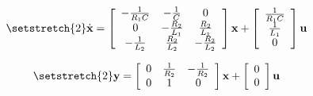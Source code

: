 \[ \setstretch{2}
  \dot{\textbf{x}}=
  \left[
    {\begin{array}{ccc}
      -\frac{1}{R_1 C} & -\frac{1}{C}     & 0 \\
      0                & -\frac{R_2}{L_1} & \frac{R_2}{L_1} \\
      -\frac{1}{L_2}   & \frac{R_2}{L_2}  & -\frac{R_2}{L_2} \\
    \end{array}}
  \right]
  \textbf{x} +
  \left[
    {\begin{array}{cc}
      \frac{1}{R_1 C} \\
      \frac{1}{L_1} \\
      0 \\
    \end{array}}
  \right]
  \textbf{u}
\]

\[ \setstretch{2}
  \textbf{y}=
  \left[
    {\begin{array}{ccc}
      0 & \frac{1}{R_2}     & -\frac{1}{R_2} \\
      0 & 1                 & 0 \\
    \end{array}}
  \right]
  \textbf{x} +
  \left[
    {\begin{array}{cc}
      0 \\
      0 \\
    \end{array}}
  \right]
  \textbf{u}
\]
